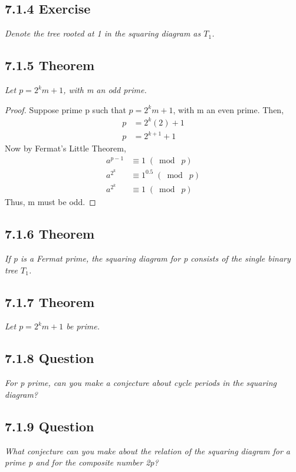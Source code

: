 \documentclass{article}
\begin{document}
\subsection*{7.1.4 Exercise} 
\quad \textit{Denote the tree rooted at 1 in the squaring diagram as $T_1$.}

\subsection*{7.1.5 Theorem} 
\quad \textit{Let $p= 2^km+1$, with m an odd prime.}

\begin{proof}
Suppose prime p such that $p= 2^km+1$, with m an even prime. Then,
\begin{align*}
    &&p &= 2^k(2)+1&&\\
    &&p &= 2^{k+1}+1&&
\end{align*}
Now by Fermat's Little Theorem,
\begin{align*}
    &&a^{p-1} &\equiv 1 \;(\bmod\; p)&&\\
    &&a^{2^k} &\equiv 1^{0.5} \;(\bmod\; p)&&\\
    &&a^{2^k} &\equiv 1 \;(\bmod\; p)&&
\end{align*}
Thus, m must be odd.
\end{proof}

\subsection*{7.1.6 Theorem} 
\quad \textit{If p is a Fermat prime, the squaring diagram for p consists of the single binary tree $T_1$.}

\subsection*{7.1.7 Theorem} 
\quad \textit{Let $p= 2^km+1$ be prime.}

\subsection*{7.1.8 Question} 
\quad \textit{For p prime, can you make a conjecture about cycle periods in the squaring diagram?}

\subsection*{7.1.9 Question} 
\quad \textit{What conjecture can you make about the relation of the squaring diagram for a prime p and for the composite number 2p?}
\end{document}
